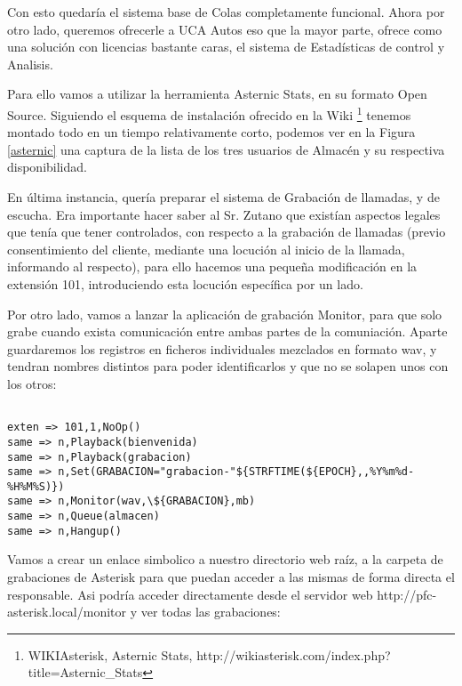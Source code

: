 Con esto quedaría el sistema base de Colas completamente funcional. Ahora por otro lado, queremos ofrecerle a UCA Autos eso que la mayor parte, ofrece como una solución con licencias bastante caras, el sistema de Estadísticas de control y Analisis.

Para ello vamos a utilizar la herramienta Asternic Stats, en su formato Open Source. Siguiendo el esquema de instalación ofrecido en la Wiki \footnote{WIKIAsterisk, Asternic Stats, http://wikiasterisk.com/index.php?title=Asternic\_Stats} \cite{website:asternic} tenemos montado todo en un tiempo relativamente corto, podemos ver en la Figura \ref{asternic} una captura de la lista de los tres usuarios de Almacén y su respectiva disponibilidad. 


En última instancia, quería preparar el sistema de Grabación de llamadas, y de escucha. Era importante hacer saber al Sr. Zutano que existían aspectos legales que tenía que tener controlados, con respecto a la grabación de llamadas (previo consentimiento del cliente, mediante una locución al inicio de la llamada, informando al respecto), para ello hacemos una pequeña modificación en la extensión 101, introduciendo esta locución específica por un lado.

Por otro lado, vamos a lanzar la aplicación de grabación Monitor, para que solo grabe cuando exista comunicación entre ambas partes de la comuniación. Aparte guardaremos los registros en ficheros individuales mezclados en formato wav, y tendran nombres distintos para poder identificarlos y que no se solapen unos con los otros:

\begin{lstlisting}[style=bash,title={/etc/asterisk/extensions.conf}]

exten => 101,1,NoOp()
same => n,Playback(bienvenida)
same => n,Playback(grabacion)
same => n,Set(GRABACION="grabacion-"${STRFTIME(${EPOCH},,%Y%m%d-%H%M%S)})
same => n,Monitor(wav,\${GRABACION},mb)
same => n,Queue(almacen)
same => n,Hangup()

\end{lstlisting}

Vamos a crear un enlace simbolico a nuestro directorio web raíz, a la carpeta de grabaciones de Asterisk para que puedan acceder a las mismas de forma directa el responsable. Asi podría acceder directamente desde el servidor web http://pfc-asterisk.local/monitor y ver todas las grabaciones:

